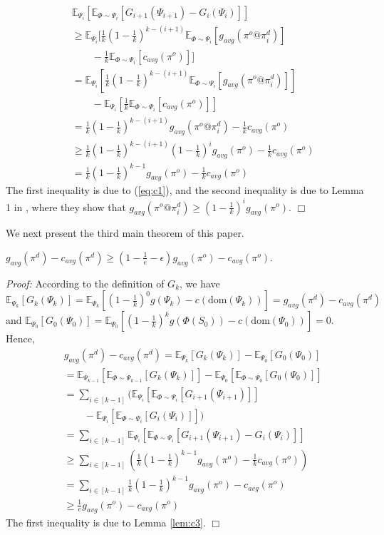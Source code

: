 \documentclass[twoside,leqno,twocolumn]{article}
\begin{document}
\begin{eqnarray*}
&&\mathbb{E}_{\Psi_i}[\mathbb{E}_{\Phi\sim \Psi_i}[G_{i+1}(\Psi_{i+1})- G_{i}(\Psi_i)]] \\
&& \geq \mathbb{E}_{\Psi_i}[\frac{1}{k}(1-\frac{1}{k})^{k-(i+1)} \mathbb{E}_{\Phi\sim \Psi_i}[g_{avg}(\pi^o@\pi^d_i)]\\
&&\quad\quad-\frac{1}{k}\mathbb{E}_{\Phi\sim \Psi_i}[c_{avg}(\pi^o)]]\\
&& = \mathbb{E}_{\Psi_i}[\frac{1}{k}(1-\frac{1}{k})^{k-(i+1)} \mathbb{E}_{\Phi\sim \Psi_i}[g_{avg}(\pi^o@\pi^d_i)]] \\
&&\quad\quad-  \mathbb{E}_{\Psi_i}[\frac{1}{k}\mathbb{E}_{\Phi\sim \Psi_i}[c_{avg}(\pi^o)]]\\
&& = \frac{1}{k}(1-\frac{1}{k})^{k-(i+1)}g_{avg}(\pi^o@\pi^d_i) -\frac{1}{k}c_{avg}(\pi^o)\\
&& \geq \frac{1}{k}(1-\frac{1}{k})^{k-(i+1)}(1-\frac{1}{k})^{i}g_{avg}(\pi^o) -\frac{1}{k}c_{avg}(\pi^o)\\
&& = \frac{1}{k}(1-\frac{1}{k})^{k-1}g_{avg}(\pi^o) -\frac{1}{k}c_{avg}(\pi^o)
\end{eqnarray*}
The first inequality is due to (\ref{eq:c1}), and the second inequality is due to Lemma 1 in \cite{tang2021beyond}, where they show that $g_{avg}(\pi^o@\pi^d_i)\geq(1-\frac{1}{k})^{i}g_{avg}(\pi^o)$.  $\Box$

We next present the third main theorem of this paper.
\begin{theorem}
$g_{avg}(\pi^d) - c_{avg}(\pi^d) \geq (1-\frac{1}{e}-\epsilon)g_{avg}(\pi^o) - c_{avg}(\pi^o)$.
\end{theorem}
\emph{Proof:} According to the definition of $G_k$, we have $\mathbb{E}_{\Psi_k}[G_{k}(\Psi_k)] = \mathbb{E}_{\Psi_k}[(1-\frac{1}{k})^{0} g(\Psi_k)-c(\textrm{dom}(\Psi_k))]=g_{avg}(\pi^d) - c_{avg}(\pi^d)$ and $\mathbb{E}_{\Psi_0}[G_{0}(\Psi_0)] = \mathbb{E}_{\Psi_0}[(1-\frac{1}{k})^{k} g(\Phi(S_0))-c(\textrm{dom}(\Psi_0))]=0$. Hence,
\begin{eqnarray*}
&& g_{avg}(\pi^d) - c_{avg}(\pi^d) = \mathbb{E}_{\Psi_k}[G_{k}(\Psi_k)] - \mathbb{E}_{\Psi_0}[G_{0}(\Psi_0)]\\
&& = \mathbb{E}_{\Psi_{k-1}}[\mathbb{E}_{\Phi \sim \Psi_{k-1}}[G_{k}(\Psi_k)]]- \mathbb{E}_{\Psi_0}[\mathbb{E}_{\Phi\sim \Psi_0}[G_{0}(\Psi_0)]] \\
&& = \sum_{i\in [k-1]}( \mathbb{E}_{\Psi_i}[\mathbb{E}_{\Phi\sim \Psi_i}[G_{i+1}(\Psi_{i+1})]]\\
&&\quad\quad- \mathbb{E}_{\Psi_i}[\mathbb{E}_{\Phi\sim \Psi_i}[G_{i}(\Psi_i)]]) \\
&& = \sum_{i\in [k-1]} \mathbb{E}_{\Psi_i}[\mathbb{E}_{\Phi\sim \Psi_i}[G_{i+1}(\Psi_{i+1})- G_{i}(\Psi_i)]] \\
&& \geq \sum_{i\in [k-1]} (\frac{1}{k}(1-\frac{1}{k})^{k-1}g_{avg}(\pi^o) -\frac{1}{k}c_{avg}(\pi^o))\\
&& = \sum_{i\in [k-1]}\frac{1}{k}(1-\frac{1}{k})^{k-1}g_{avg}(\pi^o) - c_{avg}(\pi^o)\\
&& \geq \frac{1}{e}g_{avg}(\pi^o) - c_{avg}(\pi^o)
\end{eqnarray*} The first inequality is due to Lemma \ref{lem:c3}. $\Box$
\end{document}
